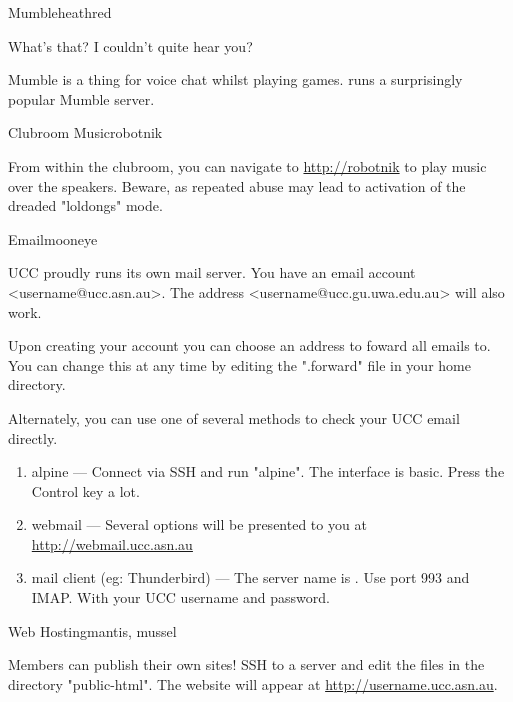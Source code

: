 \pagebreak

\begin{uccservice}{Mumble}{heathred}

What's that? I couldn't quite hear you?

Mumble is a thing for voice chat whilst playing games.  runs a surprisingly popular Mumble server.

\end{uccservice}

\begin{uccservice}{Clubroom Music}{robotnik}

From within the clubroom, you can navigate to \url{http://robotnik} to play music over the speakers. Beware, as repeated abuse may lead to activation of the dreaded "loldongs" mode.

\end{uccservice}

\begin{uccservice}{Email}{mooneye}

UCC proudly runs its own mail server. You have an email account <username@ucc.asn.au>. The address <username@ucc.gu.uwa.edu.au> will also work.

Upon creating your account you can choose an address to foward all emails to. You can change this at any time by editing the ".forward" file in your home directory.

Alternately, you can use one of several methods to check your UCC email directly.
\begin{enumerate}
	\item alpine --- Connect via SSH and run "alpine". The interface is basic. Press the Control key a lot.
	\item webmail --- Several options will be presented to you at \url{http://webmail.ucc.asn.au}
	\item mail client (eg: Thunderbird) --- The server name is . Use port 993 and IMAP. With your UCC username and password.
\end{enumerate}

\end{uccservice}

\begin{uccservice}{Web Hosting}{mantis, mussel}

Members can publish their own sites! SSH to a server and edit the files in the directory "public-html". The website will appear at \url{http://username.ucc.asn.au}.

\end{uccservice}

